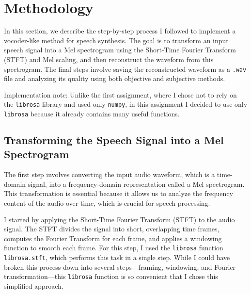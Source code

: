 \documentclass[12pt]{article}
\begin{document}



\section{Methodology}

In this section, we describe the step-by-step process I followed to implement a vocoder-like method for speech synthesis. The goal is to transform an input speech signal into a Mel spectrogram using the Short-Time Fourier Transform (STFT) and Mel scaling, and then reconstruct the waveform from this spectrogram. The final steps involve saving the reconstructed waveform as a \texttt{.wav} file and analyzing its quality using both objective and subjective methods.

Implementation note: Unlike the first assignment, where I chose not to rely on the \texttt{librosa} library and used only \texttt{numpy}, in this assignment I decided to use only \texttt{librosa} because it already contains many useful functions.

\subsection{Transforming the Speech Signal into a Mel Spectrogram}

The first step involves converting the input audio waveform, which is a time-domain signal, into a frequency-domain representation called a Mel spectrogram. This transformation is essential because it allows us to analyze the frequency content of the audio over time, which is crucial for speech processing.

I started by applying the Short-Time Fourier Transform (STFT) to the audio signal. The STFT divides the signal into short, overlapping time frames, computes the Fourier Transform for each frame, and applies a windowing function to smooth each frame. For this step, I used the \texttt{librosa} function \texttt{librosa.stft}, which performs this task in a single step. While I could have broken this process down into several steps—framing, windowing, and Fourier transformation—this \texttt{librosa} function is so convenient that I chose this simplified approach.
\end{document}
